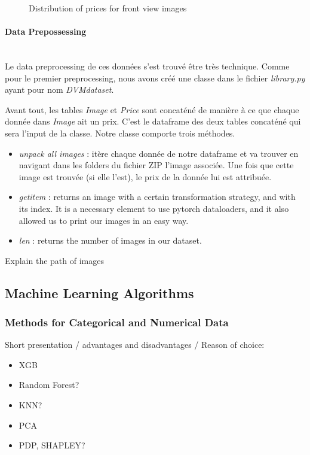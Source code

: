 \documentclass[12pt]{article}
\begin{document}
\begin{figure}[ht]
    \caption{Distribution of prices for front view images}
    \label{fig:Price distribution}
\end{figure}


\newpage
\paragraph{Data Prepossessing}
~~\\
\noindent Le data preprocessing de ces données s'est trouvé être très technique. Comme pour le premier preprocessing, nous avons créé une classe dans le fichier \textit{library.py} ayant pour nom \textit{DVMdataset}. 

\noindent Avant tout, les tables \textit{Image} et \textit{Price} sont concaténé de manière à ce que chaque donnée dans \textit{Image} ait un prix. C'est le dataframe des deux tables concaténé qui sera l'input de la classe. \noindent Notre classe comporte trois méthodes. 

\begin{itemize}
    \item \textit{unpack all images} : itère chaque donnée de notre dataframe et va trouver en navigant dans les folders du fichier ZIP l'image associée. Une fois que cette image est trouvée (si elle l'est), le prix de la donnée lui est attribuée. 

    \item \textit{getitem} : returns an image with a certain transformation strategy, and with its index. It is a necessary element to use pytorch dataloaders, and it also allowed us to print our images in an easy way.
    
    \item \textit{len} : returns the number of images in our dataset.
\end{itemize}


\noindent Explain the path of images



\subsection{Machine Learning Algorithms}
\subsubsection{Methods for Categorical and Numerical Data}
Short presentation / advantages and disadvantages / Reason of choice:
\begin{itemize}
    \item XGB
    \item Random Forest?

    \item KNN?
    \item PCA 
    \item PDP, SHAPLEY?
\end{itemize}
\end{document}
